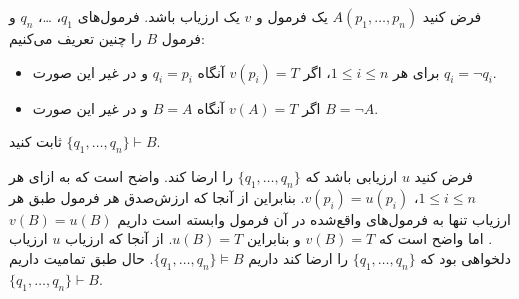 فرض کنید
$A(p_1,\ldots,p_n)$
یک فرمول و $v$ یک ارزیاب باشد. فرمول‌های $q_1$، \ldots، $q_n$ و فرمول $B$ را چنین تعریف می‌کنیم:
\begin{itemize}[label={--}]
\item
برای هر $1\leq i\leq n$، اگر $v(p_i)=T$ آنگاه $q_i=p_i$ و در غیر این صورت $q_i=\neg q_i$.

\item
اگر $v(A)=T$ آنگاه $B=A$ و در غیر این صورت $B=\neg A$.
\end{itemize}
ثابت کنید
$\{q_1,\ldots,q_n\}\vdash B$.
\begin{ans}
  فرض کنید $u$ ارزیابی باشد که
  $\{q_1,\ldots,q_n\}$
  را ارضا کند. واضح است که به ازای هر  $1\leq i\leq n$،
  $v(p_i)=u(p_i)$.
  بنابراین از آنجا که ارزش‌صدق هر فرمول طبق هر ارزیاب تنها به فرمول‌های واقع‌شده در آن فرمول وابسته است داریم
  $v(B)=u(B)$.
  اما واضح است که $v(B)=T$ و بنابراین $u(B)=T$. از آنجا که ارزیاب $u$ ارزیاب دلخواهی بود که
  $\{q_1,\ldots,q_n\}$
  را ارضا کند داریم
  $\{q_1,\ldots,q_n\}\vDash B$.
  حال طبق تمامیت داریم
  $\{q_1,\ldots,q_n\}\vdash B$.
\end{ans}